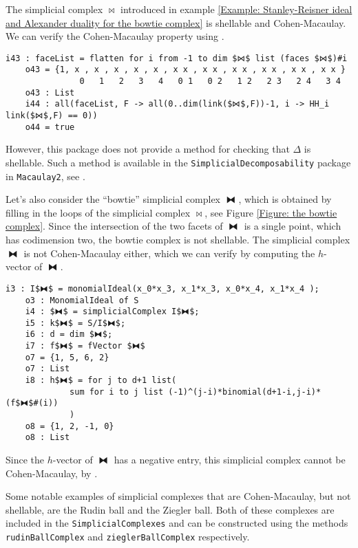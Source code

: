 \documentclass[12pt,leqno]{amsart}
\theoremstyle{definition}
\newenvironment{example}
{\pushQED{\qed}\renewcommand{\qedsymbol}{$\diamond$}\examplex}
{\popQED\endexamplex}
\begin{document}
\begin{example}\label{Example: Shellability, the Cohen-Macaulay property, and the h-vector}
  The simplicial complex $\bowtie$ introduced in example \ref{Example: Stanley-Reisner ideal and Alexander duality for the bowtie complex} is shellable and Cohen-Macaulay. We can verify the Cohen-Macaulay property using \cite[Corollary 5.3.9]{BH}.
\begin{lstlisting}[basicstyle={\ttfamily \scriptsize}, xleftmargin=-23pt]
    i43 : faceList = flatten for i from -1 to dim $⋈$ list (faces $⋈$)#i
    o43 = {1, x , x , x , x , x , x x , x x , x x , x x , x x , x x }
               0   1   2   3   4   0 1   0 2   1 2   2 3   2 4   3 4
    o43 : List
    i44 : all(faceList, F -> all(0..dim(link($⋈$,F))-1, i -> HH_i link($⋈$,F) == 0))
    o44 = true
\end{lstlisting}
  However, this package does not provide a method for checking that $\Delta$ is shellable. Such a method is available in the \texttt{SimplicialDecomposability} package in \texttt{Macaulay2}, see \cite{Cook}.

  Let's also consider the ``bowtie'' simplicial complex $\fbowtie$, which is obtained by filling in the loops of the simplicial complex $\bowtie$, see Figure \ref{Figure: the bowtie complex}. Since the intersection of the two facets of $\fbowtie$ is a single point, which has codimension two, the bowtie complex is not shellable. The simplicial complex $\fbowtie$ is not Cohen-Macaulay either, which we can verify by computing the $h$-vector of $\fbowtie$.
\begin{lstlisting}[basicstyle={\ttfamily \scriptsize}, xleftmargin=-23pt]
    i3 : I$⧓$ = monomialIdeal(x_0*x_3, x_1*x_3, x_0*x_4, x_1*x_4 );
    o3 : MonomialIdeal of S
    i4 : $⧓$ = simplicialComplex I$⧓$;
    i5 : k$⧓$ = S/I$⧓$;
    i6 : d = dim $⧓$;
    i7 : f$⧓$ = fVector $⧓$
    o7 = {1, 5, 6, 2}
    o7 : List
    i8 : h$⧓$ = for j to d+1 list(
             sum for i to j list (-1)^(j-i)*binomial(d+1-i,j-i)*(f$⧓$#(i))
             )
    o8 = {1, 2, -1, 0}
    o8 : List
\end{lstlisting}
  Since the $h$-vector of $\fbowtie$ has a negative entry, this simplicial complex cannot be Cohen-Macaulay, by \cite[Lemma 5.1.10]{BH}.

  Some notable examples of simplicial complexes that are Cohen-Macaulay, but not shellable, are the Rudin ball and the Ziegler ball. Both of these complexes are included in the \texttt{SimplicialComplexes} and can be constructed using the methods \texttt{rudinBallComplex} and \texttt{zieglerBallComplex} respectively.
\end{example}
\end{document}
